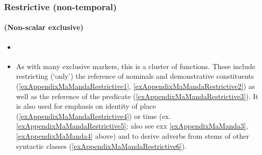 \subsubsection{Restrictive (non-temporal)}
\paragraph{(Non-scalar exclusive)}
\label{appendixMaMandaRestrictive}
\begin{itemize}
	\item \textcite[151–157, 164–167]{Pennington2016}
	\item As with many exclusive markers, this is a cluster of functions. These include restricting (\lq only') the reference of nominals and demonstrative constituents (\ref{exAppendixMaMandaRestrictive1}, \ref{exAppendixMaMandaRestrictive2}) as well as the reference of the predicate (\ref{exAppendixMaMandaRestrictive3}). It is also used for emphasis on identity of place (\ref{exAppendixMaMandaRestrictive4}) or time (ex. \ref{exAppendixMaMandaRestrictive5}; also see exx \ref{exAppendixMaManda3}, \ref{exAppendixMaManda4} above) and to derive adverbs from stems of other syntactic classes (\ref{exAppendixMaMandaRestrictive6}).
\end{itemize}
